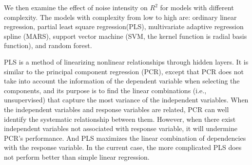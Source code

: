 \documentclass[12pt,]{krantz}
\makeatletter
\newenvironment{Shaded}{\begin{snugshade}}{\end{snugshade}}
\newcommand{\KeywordTok}[1]{\textcolor[rgb]{0.27,0.27,0.27}{\textbf{#1}}}
\newcommand{\DataTypeTok}[1]{\textcolor[rgb]{0.27,0.27,0.27}{#1}}
\newcommand{\DecValTok}[1]{\textcolor[rgb]{0.06,0.06,0.06}{#1}}
\newcommand{\StringTok}[1]{\textcolor[rgb]{0.5,0.5,0.5}{#1}}
\newcommand{\CommentTok}[1]{\textcolor[rgb]{0.37,0.37,0.37}{\textit{#1}}}
\newcommand{\ControlFlowTok}[1]{\textcolor[rgb]{0.27,0.27,0.27}{\textbf{#1}}}
\newcommand{\OperatorTok}[1]{\textcolor[rgb]{0.43,0.43,0.43}{\textbf{#1}}}
\newcommand{\NormalTok}[1]{#1}
\newenvironment{kframe}{%
\medskip{}
\setlength{\fboxsep}{.8em}
 \def\at@end@of@kframe{}%
 \ifinner\ifhmode%
  \def\at@end@of@kframe{\end{minipage}}%
  \begin{minipage}{\columnwidth}%
 \fi\fi%
 \def\FrameCommand##1{\hskip\@totalleftmargin \hskip-\fboxsep
 \colorbox{shadecolor}{##1}\hskip-\fboxsep
     \hskip-\linewidth \hskip-\@totalleftmargin \hskip\columnwidth}%
 \MakeFramed {\advance\hsize-\width
   \@totalleftmargin\z@ \linewidth\hsize
   \@setminipage}}%
 {\par\unskip\endMakeFramed%
 \at@end@of@kframe}
\renewenvironment{Shaded}{\begin{kframe}}{\end{kframe}}
\theoremstyle{definition}
\theoremstyle{definition}
\theoremstyle{definition}
\theoremstyle{remark}
\makeatother
\begin{document}
We then examine the effect of noise intensity on \(R^2\) for models with
different complexity. The models with complexity from low to high are:
ordinary linear regression, partial least square regression(PLS),
multivariate adaptive regression spline (MARS), support vector machine
(SVM, the kernel function is radial basis function), and random forest.

\begin{Shaded}
\end{Shaded}

PLS is a method of linearizing nonlinear relationships through hidden
layers. It is similar to the principal component regression (PCR),
except that PCR does not take into account the information of the
dependent variable when selecting the components, and its purpose is to
find the linear combinations (i.e., unsupervised) that capture the most
variance of the independent variables. When the independent variables
and response variables are related, PCR can well identify the systematic
relationship between them. However, when there exist independent
variables not associated with response variable, it will undermine PCR's
performance. And PLS maximizes the linear combination of dependencies
with the response variable. In the current case, the more complicated
PLS does not perform better than simple linear regression.
\end{document}
